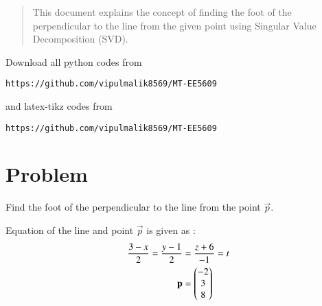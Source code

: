 \documentclass[journal,12pt,twocolumn]{IEEEtran}
\begin{document}
\date{\today}

\maketitle
\newpage
\bigskip
\renewcommand{\thefigure}{\theenumi}
\renewcommand{\thetable}{\theenumi}

\begin{abstract}
This document explains the concept of finding the foot of the perpendicular to the line from the given point using Singular Value Decomposition (SVD).
\end{abstract}
Download all python codes from 
\begin{lstlisting}
https://github.com/vipulmalik8569/MT-EE5609
\end{lstlisting}
and latex-tikz codes from 
\begin{lstlisting}
https://github.com/vipulmalik8569/MT-EE5609
\end{lstlisting}
\section{\textbf{Problem}}
Find the foot of the perpendicular to the line from the point $\vec{p}$. 

Equation of the line and point $\vec{p}$ is given as : 
\begin{align}
\frac{3-x}{2}=\frac{y-1}{2}&=\frac{z+6}{-1}=t\label{eq:0}\\
\mathbf{p}&=\begin{pmatrix}-2\\3\\8\end{pmatrix}
\end{align}
\end{document}
